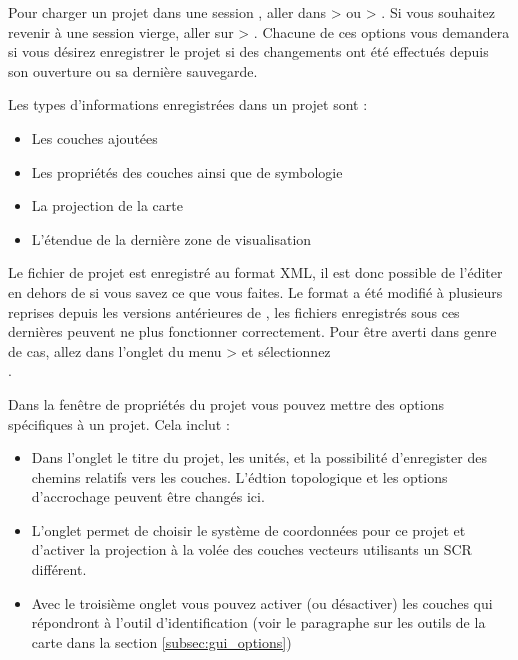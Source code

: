 Pour charger un projet dans une session \qg, aller dans  >  ou  > . Si vous souhaitez revenir à une session vierge, aller sur  > .
Chacune de ces options vous demandera si vous désirez enregistrer le projet si des changements ont été effectués depuis son ouverture ou sa dernière sauvegarde.

Les types d'informations enregistrées dans un projet sont :

\begin{itemize}[label=--]
\item Les couches ajoutées
\item Les propriétés des couches ainsi que de symbologie
\item La projection de la carte
\item L'étendue de la dernière zone de visualisation
\end{itemize}

Le fichier de projet est enregistré au format XML, il est donc possible de l'éditer en dehors de \qg si vous savez ce que vous faites. Le format a été modifié à plusieurs reprises depuis les versions antérieures de \qg, les fichiers enregistrés sous ces dernières peuvent ne plus fonctionner correctement. Pour être averti dans genre de cas, allez dans l'onglet  du menu  >  et sélectionnez\\ .

Dans la fenêtre de propriétés du projet vous pouvez mettre des options spécifiques à un projet. Cela inclut :
\begin{itemize}[label=--]
 \item Dans l'onglet  le titre du projet, les unités, et la possibilité d'enregister des chemins relatifs vers les couches. L'édtion topologique et les options d'accrochage peuvent être changés ici.
\item L'onglet  permet de choisir le système de coordonnées pour ce projet et d'activer la projection à la volée des couches vecteurs utilisants un SCR différent.
\item Avec le troisième onglet  vous pouvez activer (ou désactiver) les couches qui répondront à l'outil d'identification (voir le paragraphe sur les outils de la carte dans la section \ref{subsec:gui_options})
\end{itemize}

